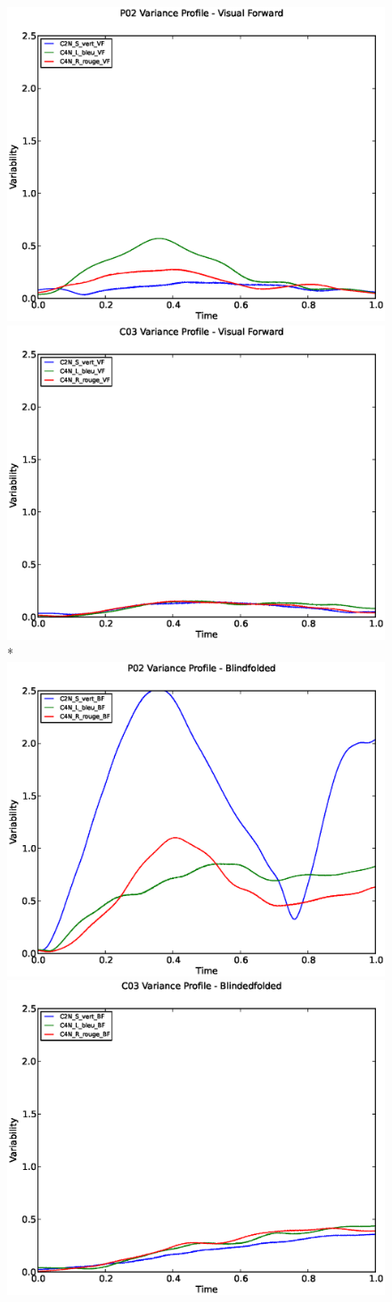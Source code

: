 \documentclass[a4page,landscape,twocolumn,10pt]{article}
\begin{document}
\begin{figure}
  \centering
  \includegraphics[width=0.45\linewidth]{P02_Variability_profile_VF.eps}
  \includegraphics[width=0.45\linewidth]{C03_Variability_profile_VF.eps}
  \\*
  \includegraphics[width=0.45\linewidth]{P02_Variability_profile_BF.eps}
  \includegraphics[width=0.45\linewidth]{C03_Variability_profile_BF.eps}
\end{figure}

\clearpage
\end{document}
